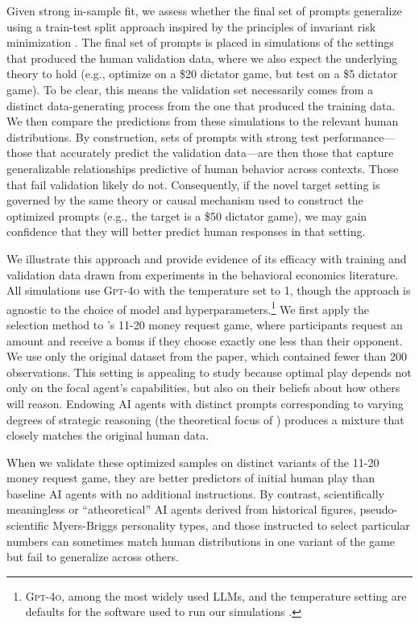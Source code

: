 \documentclass[11pt]{article}
\theoremstyle{definition}
\newcommand{\aisub}{AI agent}
\newcommand{\persona}{prompt}
\begin{document}
Given strong in-sample fit, we assess whether the final set of \persona{s} generalize using a train-test split approach inspired by the principles of invariant risk minimization \citep{Peters2016invariant,Heinze2018invariant,arjovsky2020invariant}.
The final set of \persona{s} is placed in simulations of the settings that produced the human validation data, where we also expect the underlying theory to hold (e.g., optimize on a \$20 dictator game, but test on a \$5 dictator game).
To be clear, this means the validation set necessarily comes from a distinct data-generating process from the one that produced the training data. 
We then compare the predictions from these simulations to the relevant human distributions.
By construction, sets of \persona{s} with strong test performance---those that accurately predict the validation data---are then those that capture generalizable relationships predictive of human behavior across contexts.
Those that fail validation likely do not.
Consequently, if the novel target setting is governed by the same theory or causal mechanism used to construct the optimized \persona{s} (e.g., the target is a \$50 dictator game), we may gain confidence that they will better predict human responses in that setting.

We illustrate this approach and provide evidence of its efficacy with training and validation data drawn from experiments in the behavioral economics literature.
All simulations use \textsc{Gpt-4o} with the temperature set to 1, though the approach is agnostic to the choice of model and hyperparameters.\footnote{\textsc{Gpt-4o}, among the most widely used LLMs, and the temperature setting are defaults for the software used to run our simulations \citep{Horton2024EDSL}.}
We first apply the selection method to \citet{1120Arad2012}'s 11-20 money request game, where participants request an amount and receive a bonus if they choose exactly one less than their opponent. 
We use only the original dataset from the paper, which contained fewer than 200 observations.
This setting is appealing to study because optimal play depends not only on the focal agent's capabilities, but also on their beliefs about how others will reason.
Endowing \aisub{s} with distinct \persona{s} corresponding to varying degrees of strategic reasoning (the theoretical focus of \citeauthor{1120Arad2012}) produces a mixture that closely matches the original human data.

When we validate these optimized samples on distinct variants of the 11-20 money request game, they are better predictors of initial human play than baseline \aisub{s} with no additional instructions.
By contrast, scientifically meaningless or ``atheoretical'' \aisub{s} derived from historical figures, pseudo-scientific Myers-Briggs personality types, and those instructed to select particular numbers can sometimes match human distributions in one variant of the game but fail to generalize across others.
\end{document}
